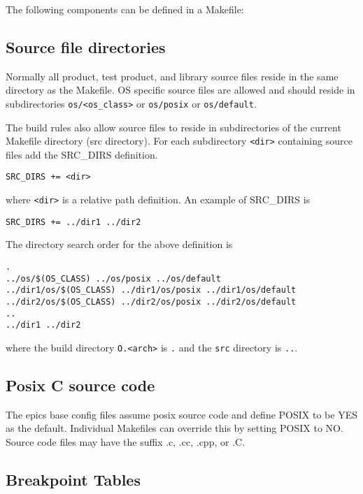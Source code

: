 The following components can be defined in a Makefile:

\subsection{Source file directories}

Normally all product, test product, and library source files reside in the same directory as the Makefile. OS specific source files are allowed and should reside in subdirectories \verb|os/<os_class>| or \verb|os/posix| or \verb|os/default|.

The build rules also allow source files to reside in subdirectories of the current Makefile directory (src directory). For each subdirectory \verb|<dir>| containing source files add the SRC\_DIRS definition.

\begin{verbatim}
SRC_DIRS += <dir>
\end{verbatim}

where \verb|<dir>| is a relative path definition. An example of SRC\_DIRS is

\begin{verbatim}
SRC_DIRS += ../dir1 ../dir2
\end{verbatim}

The directory search order for the above definition is 

\begin{verbatim}
. 
../os/$(OS_CLASS) ../os/posix ../os/default
../dir1/os/$(OS_CLASS) ../dir1/os/posix ../dir1/os/default 
../dir2/os/$(OS_CLASS) ../dir2/os/posix ../dir2/os/default
..
../dir1 ../dir2
\end{verbatim}

where the build directory \verb|O.<arch>| is \verb|.| and the \verb|src| directory is \verb|..|. 

\subsection{Posix C source code}

The epics base config files assume posix source code and define POSIX to be YES as the default. Individual Makefiles 
can override this by setting POSIX to NO. Source code files may have the suffix .c, .cc, .cpp, or .C.

\subsection{Breakpoint Tables}

